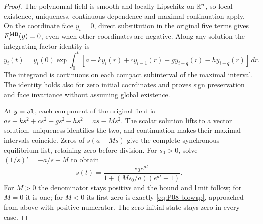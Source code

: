 \begin{proof}
The polynomial field is smooth and locally Lipschitz on $\mathbb{R}^n$, so
local existence, uniqueness, continuous dependence and maximal
continuation apply. On the coordinate face $y_i=0$, direct substitution
in the original five terms gives $F_i^{\mathrm{MB}}(y)=0$, even when other
coordinates are negative. Along any solution the integrating-factor
identity is
\begin{equation}
 y_i(t)=y_i(0)\exp\int_0^t
 [a-ky_i(r)+cy_{i-1}(r)-gy_{i+q}(r)-hy_{i-q}(r)]\,dr.
 \label{eq:P08-coordinate}
\end{equation}
The integrand is continuous on each compact subinterval of the maximal
interval. The identity holds also for zero initial coordinates and
proves sign preservation and face invariance without assuming global
existence.

At $y=s\mathbf{1}$, each component of the original field is
$as-ks^2+cs^2-gs^2-hs^2=as-Ms^2$. The scalar solution lifts to a
vector solution, uniqueness identifies the two, and continuation makes
their maximal intervals coincide. Zeros of $s(a-Ms)$ give the complete
synchronous equilibrium list, retaining zero before division. For
$s_0>0$, solve $(1/s)'=-a/s+M$ to obtain
\begin{equation}
 s(t)=\frac{s_0e^{at}}{1+(Ms_0/a)(e^{at}-1)}.\label{eq:P08-logistic}
\end{equation}
For $M>0$ the denominator stays positive and the bound and limit follow;
for $M=0$ it is one; for $M<0$ its first zero is exactly
\eqref{eq:P08-blowup}, approached from above with positive numerator.
The zero initial state stays zero in every case.
\end{proof}

